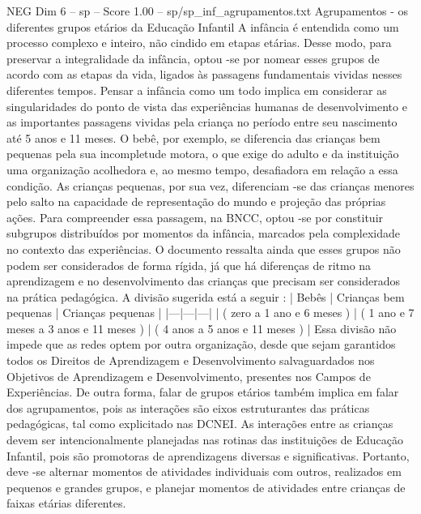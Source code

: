 \begin{textsample}{NEG Dim 6 – sp – Score 1.00 – sp/sp\_inf\_agrupamentos.txt}  \label{ex:f6_neg_205}
Agrupamentos - os diferentes grupos etários da Educação Infantil A infância é entendida como um processo complexo e inteiro, não cindido em etapas etárias.
Desse modo, para preservar a integralidade da infância, optou -se por nomear esses grupos de acordo com as etapas da vida, ligados às passagens fundamentais vividas nesses diferentes tempos.
Pensar a infância como um todo implica em considerar as singularidades do ponto de vista das experiências humanas de desenvolvimento e as importantes passagens vividas pela criança no período entre seu nascimento até 5 anos e 11 meses.
O bebê, por exemplo, se diferencia das crianças bem pequenas pela sua incompletude motora, o que exige do adulto e da instituição uma organização acolhedora e, ao mesmo tempo, desafiadora em relação a essa condição.
As crianças pequenas, por sua vez, diferenciam -se das crianças menores pelo salto na capacidade de representação do mundo e projeção das próprias ações.
Para compreender essa passagem, na BNCC, optou -se por constituir subgrupos distribuídos por momentos da infância, marcados pela complexidade no contexto das experiências.
O documento ressalta ainda que esses grupos não podem ser considerados de forma rígida, já que há diferenças de ritmo na aprendizagem e no desenvolvimento das crianças que precisam ser considerados na prática pedagógica.
A divisão sugerida está a seguir : | Bebês | Crianças bem pequenas | Crianças pequenas | |---|---|---| | ( zero a 1 ano e 6 meses ) | ( 1 ano e 7 meses a 3 anos e 11 meses ) | ( 4 anos a 5 anos e 11 meses ) | Essa divisão não impede que as redes optem por outra organização, desde que sejam garantidos todos os Direitos de Aprendizagem e Desenvolvimento salvaguardados nos Objetivos de Aprendizagem e Desenvolvimento, presentes nos Campos de Experiências.
De outra forma, falar de grupos etários também implica em falar dos agrupamentos, pois as interações são eixos estruturantes das práticas pedagógicas, tal como explicitado nas DCNEI.
As interações entre as crianças devem ser intencionalmente planejadas nas rotinas das instituições de Educação Infantil, pois são promotoras de aprendizagens diversas e significativas.
Portanto, deve -se alternar momentos de atividades individuais com outros, realizados em pequenos e grandes grupos, e planejar momentos de atividades entre crianças de faixas etárias diferentes.

\end{textsample}
